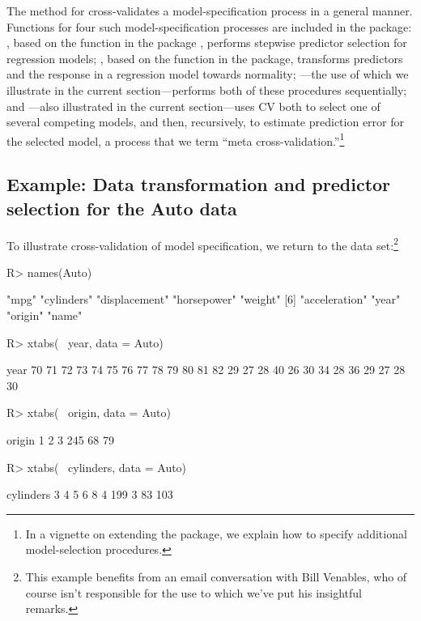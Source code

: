 \documentclass[
]{jss}
\begin{document}
The  method for  cross-validates a
model-specification process in a general manner. Functions for four such
model-specification processes are included in the package:
, based on the  function in the
 package \citep{VenablesRipley:2002}, performs stepwise
predictor selection for regression models; , based
on the  function in the  package,
transforms predictors and the response in a regression model towards
normality; ---the use of which we illustrate
in the current section---performs both of these procedures sequentially;
and ---also illustrated in the current
section---uses CV both to select one of several competing models, and
then, recursively, to estimate prediction error for the selected model,
a process that we term ``meta cross-validation.''\footnote{In a vignette
  on extending the  package, we explain how to specify
  additional model-selection procedures.}

\subsection{Example: Data transformation and predictor selection for the
Auto
data}\label{example-data-transformation-and-predictor-selection-for-the-auto-data}

To illustrate cross-validation of model specification, we return to the
 data set:\footnote{This example benefits from an email
  conversation with Bill Venables, who of course isn't responsible for
  the use to which we've put his insightful remarks.}

\begin{CodeChunk}
\begin{CodeInput}
R> names(Auto)
\end{CodeInput}
\begin{CodeOutput}
[1] "mpg"          "cylinders"    "displacement" "horsepower"   "weight"
[6] "acceleration" "year"         "origin"       "name"
\end{CodeOutput}
\begin{CodeInput}
R> xtabs(~ year, data = Auto)
\end{CodeInput}
\begin{CodeOutput}
year
70 71 72 73 74 75 76 77 78 79 80 81 82
29 27 28 40 26 30 34 28 36 29 27 28 30
\end{CodeOutput}
\begin{CodeInput}
R> xtabs(~ origin, data = Auto)
\end{CodeInput}
\begin{CodeOutput}
origin
  1   2   3
245  68  79
\end{CodeOutput}
\begin{CodeInput}
R> xtabs(~ cylinders, data = Auto)
\end{CodeInput}
\begin{CodeOutput}
cylinders
  3   4   5   6   8
  4 199   3  83 103
\end{CodeOutput}
\end{CodeChunk}
\end{document}
